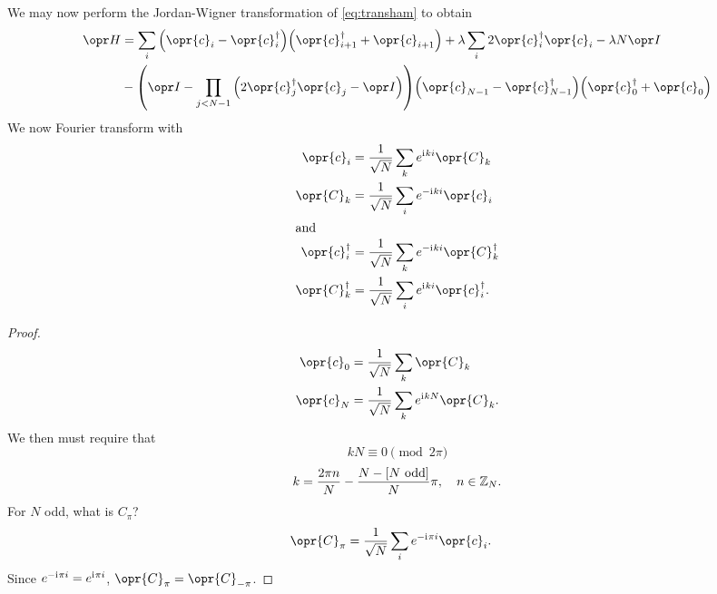 \documentclass[../thesis.tex]{subfiles}
\begin{document}
We may now perform the Jordan-Wigner transformation of \cref{eq:transham} to
obtain
\begin{align}
  \ham
  &= \sum_i \qty(\opr{c}_i - \opr{c}_i^\dag) \qty(\opr{c}_{i+1}^\dag + \opr{c}_{i+1})
  + \lambda\sum_i 2\opr{c}_i^\dag\opr{c}_i
  - \lambda N \idopr \\
  &- \qty(\idopr - \prod_{j < N-1}\qty(2\opr{c}_j^\dag \opr{c}_j - \idopr))
  \qty(\opr{c}_{N-1} - \opr{c}_{N-1}^\dag) \qty(\opr{c}_0^\dag + \opr{c}_0)
  \label{eq:cham}
\end{align}
We now Fourier transform with
\begin{subequations}
\begin{align}
  \opr{c}_i
  &= \frac{1}{\sqrt{N}}\sum_k e^{\im ki} \opr{C}_k
  \label{eq:fourierc} \\
  \opr{C}_k
  &= \frac{1}{\sqrt{N}}\sum_i e^{-\im ki} \opr{c}_i
  \label{eq:fourierC} \\
  \shortintertext{and}
  \opr{c}_i^\dag
  &= \frac{1}{\sqrt{N}}\sum_k e^{-\im ki} \opr{C}_k^\dag
  \label{eq:fourierct} \\
  \opr{C}_k^\dag
  &= \frac{1}{\sqrt{N}}\sum_i e^{\im ki} \opr{c}_i^\dag
  \label{eq:fourierCt}.
\end{align}\label{eq:fourier}
\end{subequations}
\begin{proof}
  \begin{align}
    \opr{c}_0
    &= \frac{1}{\sqrt{N}}\sum_k \opr{C}_k \\
    \opr{c}_N
    &= \frac{1}{\sqrt{N}}\sum_k e^{\im kN} \opr{C}_k.
  \end{align}
  We then must require that
  \begin{equation}
    kN
    \equiv 0 \pmod{2\pi}
  \end{equation}
  \begin{equation}
    k
    = \frac{2\pi n}{N} - \frac{N - [\text{$N$ odd}]}{N}\pi \qc
    n \in \ZZ_N.
    \label{eq:fourierk}
  \end{equation}
  For $N$ odd, what is $C_{\pi}$?
  \begin{align}
    \opr{C}_{\pi}
    &= \frac{1}{\sqrt{N}} \sum_i e^{-\im \pi i} \opr{c}_i.
  \end{align}
  Since $e^{-\mathrm{i}\mkern1mu\pi i} = e^{\mathrm{i}\mkern1mu\pi i}$, $\opr{C}_\pi = \opr{C}_{-\pi}$.
\end{proof}
\end{document}
